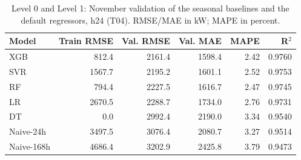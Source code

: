 \begin{table}[H]\centering\small
\caption{Level 0 and Level 1: November validation of the seasonal baselines and the default regressors, h24 (T04). RMSE/MAE in kW; MAPE in percent.}\label{tab:baselines}
\setlength{\tabcolsep}{4pt}
\begin{tabular}{lrrrrr}
\toprule
Model & Train RMSE & Val. RMSE & Val. MAE & MAPE & R$^2$ \\
\midrule
XGB & \num{812.4} & \num{2161.4} & \num{1598.4} & \num{2.42} & \num{0.9760} \\
SVR & \num{1567.7} & \num{2195.2} & \num{1601.1} & \num{2.52} & \num{0.9753} \\
RF & \num{794.4} & \num{2227.5} & \num{1616.7} & \num{2.47} & \num{0.9745} \\
LR & \num{2670.5} & \num{2288.7} & \num{1734.0} & \num{2.76} & \num{0.9731} \\
DT & \num{0.0} & \num{2992.4} & \num{2190.0} & \num{3.34} & \num{0.9540} \\
Naive-24h & \num{3497.5} & \num{3076.4} & \num{2080.7} & \num{3.27} & \num{0.9514} \\
Naive-168h & \num{4686.4} & \num{3202.9} & \num{2425.8} & \num{3.79} & \num{0.9473} \\
\bottomrule\end{tabular}
\end{table}
